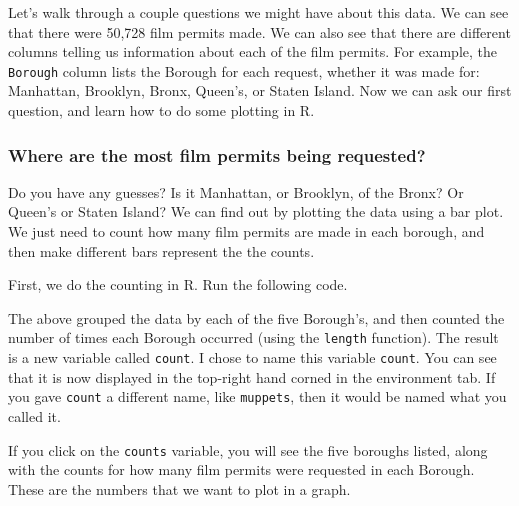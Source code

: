 \documentclass[]{book}
\newenvironment{Shaded}{\begin{snugshade}}{\end{snugshade}}
\newcommand{\KeywordTok}[1]{\textcolor[rgb]{0.13,0.29,0.53}{\textbf{#1}}}
\newcommand{\DataTypeTok}[1]{\textcolor[rgb]{0.13,0.29,0.53}{#1}}
\newcommand{\StringTok}[1]{\textcolor[rgb]{0.31,0.60,0.02}{#1}}
\newcommand{\OperatorTok}[1]{\textcolor[rgb]{0.81,0.36,0.00}{\textbf{#1}}}
\newcommand{\NormalTok}[1]{#1}
\begin{document}
Let's walk through a couple questions we might have about this data. We
can see that there were 50,728 film permits made. We can also see that
there are different columns telling us information about each of the
film permits. For example, the \texttt{Borough} column lists the Borough
for each request, whether it was made for: Manhattan, Brooklyn, Bronx,
Queen's, or Staten Island. Now we can ask our first question, and learn
how to do some plotting in R.

\subsubsection{Where are the most film permits being
requested?}\label{where-are-the-most-film-permits-being-requested}

Do you have any guesses? Is it Manhattan, or Brooklyn, of the Bronx? Or
Queen's or Staten Island? We can find out by plotting the data using a
bar plot. We just need to count how many film permits are made in each
borough, and then make different bars represent the the counts.

First, we do the counting in R. Run the following code.

\begin{Shaded}
\end{Shaded}

The above grouped the data by each of the five Borough's, and then
counted the number of times each Borough occurred (using the
\texttt{length} function). The result is a new variable called
\texttt{count}. I chose to name this variable \texttt{count}. You can
see that it is now displayed in the top-right hand corned in the
environment tab. If you gave \texttt{count} a different name, like
\texttt{muppets}, then it would be named what you called it.

If you click on the \texttt{counts} variable, you will see the five
boroughs listed, along with the counts for how many film permits were
requested in each Borough. These are the numbers that we want to plot in
a graph.
\end{document}
